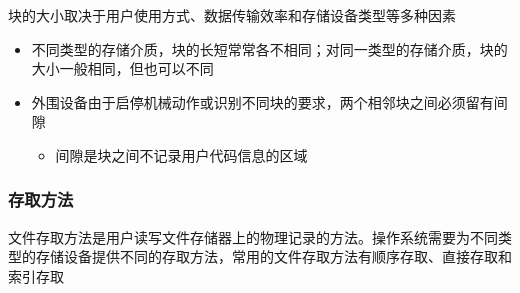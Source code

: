 \documentclass[cs4size,a4paper,10pt]{ctexart}
\begin{document}
	块的大小取决于用户使用方式、数据传输效率和存储设备类型等多种因素
	\begin{itemize}
		\item 不同类型的存储介质，块的长短常常各不相同；对同一类型的存储介质，块的大小一般相同，但也可以不同
		\item 外围设备由于启停机械动作或识别不同块的要求，两个相邻块之间必须留有间隙
		\begin{itemize}
			\item 间隙是块之间不记录用户代码信息的区域
		\end{itemize}
	\end{itemize}


	\subsubsection{存取方法}
	文件存取方法是用户读写文件存储器上的物理记录的方法。操作系统需要为不同类型的存储设备提供不同的存取方法，常用的文件存取方法有顺序存取、直接存取和索引存取
\end{document}
